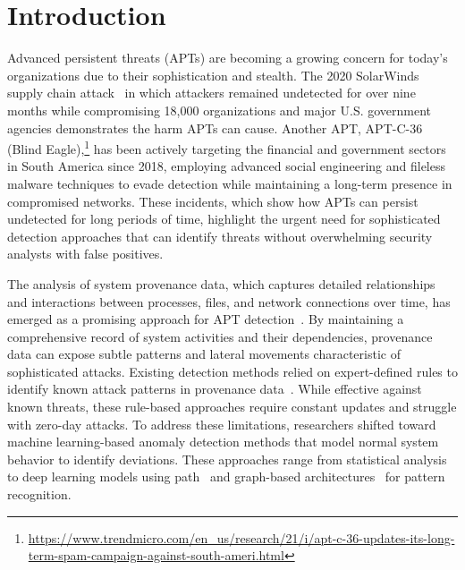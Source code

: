 \section{Introduction}

Advanced persistent threats (APTs) are becoming a growing concern for today's organizations due to their sophistication and stealth. 
The 2020 SolarWinds supply chain attack~\cite{lazarovitz2021deconstructing} in which attackers remained undetected for over nine months while compromising 18,000 organizations and major U.S. government agencies demonstrates the harm APTs can cause.
Another APT, APT-C-36 (Blind Eagle),\footnote{\small\url{https://www.trendmicro.com/en_us/research/21/i/apt-c-36-updates-its-long-term-spam-campaign-against-south-ameri.html}} has been actively targeting the financial and government sectors in South America since 2018, employing advanced social engineering and fileless malware techniques to evade detection while maintaining a long-term presence in compromised networks. These incidents, which show how APTs can persist undetected for long periods of time, highlight the urgent need for sophisticated detection approaches that can identify threats without overwhelming security analysts with false positives.

The analysis of system provenance data, which captures detailed relationships and interactions between processes, files, and network connections over time, has emerged as a promising approach for APT detection~\cite{zipperle2022provenance,inam2023sok}. 
By maintaining a comprehensive record of system activities and their dependencies, provenance data can expose subtle patterns and lateral movements characteristic of sophisticated attacks. 
Existing detection methods relied on expert-defined rules %
to identify known attack patterns in provenance data~\cite{hossain2017sleuth,milajerdi2019holmes,hassan2020tactical,kurniawan2022krystal}. 
While effective against known threats, these rule-based approaches require constant updates and struggle with zero-day attacks. 
To address these limitations, researchers shifted toward machine learning-based anomaly detection methods that model normal system behavior to identify deviations. These approaches range from statistical analysis~\cite{hossain2017sleuth,hassan2019nodoze,wang2020you,kurniawan2022krystal,dong2023distdet,Li_2024} to deep learning models using path~\cite{du2017deeplog,zhang2019robust,guo2021logbert,alsaheel2021atlas} and graph-based architectures~\cite{han2020unicorn,wang2022threatrace,zengy2022shadewatcher,jia2023magic,yang2023prographer} for pattern recognition.

